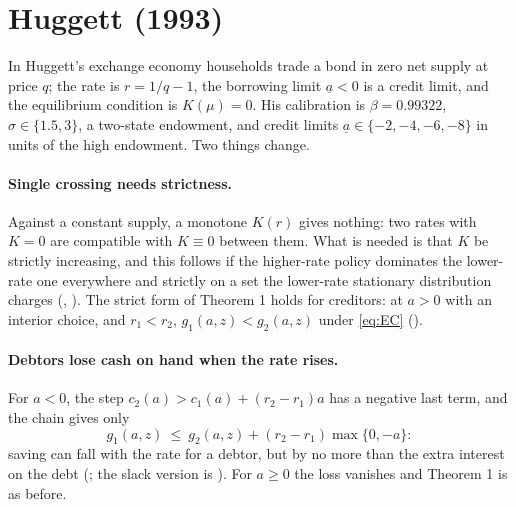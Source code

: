 \section{Huggett (1993)}\label{sec:huggett}

In Huggett's exchange economy households trade a bond in zero net supply at price $q$; the rate is
$r=1/q-1$, the borrowing limit $\underline a<0$ is a credit limit, and the equilibrium condition is
$K(\mu)=0$. His calibration is $\beta=0.99322$, $\sigma\in\{1.5,3\}$, a two-state endowment, and
credit limits $\underline a\in\{-2,-4,-6,-8\}$ in units of the high endowment. Two things change.

\paragraph{Single crossing needs strictness.}
Against a constant supply, a monotone $K(r)$ gives nothing: two rates with $K=0$ are compatible
with $K\equiv0$ between them. What is needed is that $K$ be strictly increasing, and this follows
if the higher-rate policy dominates the lower-rate one everywhere and strictly on a set the
lower-rate stationary distribution charges (,
). The strict form of Theorem 1 holds for creditors: at
$a>0$ with an interior choice, and $r_1<r_2$, $g_1(a,z)<g_2(a,z)$ under \eqref{eq:EC}
().

\paragraph{Debtors lose cash on hand when the rate rises.}
For $a<0$, the step $c_2(a)>c_1(a)+(r_2-r_1)a$ has a negative last term, and the chain gives only
\begin{equation}\label{eq:loss}
  g_1(a,z)\ \le\ g_2(a,z)+(r_2-r_1)\max\{0,-a\}:
\end{equation}
saving can fall with the rate for a debtor, but by no more than the extra interest on the debt
(; the slack version is
). For $a\ge0$ the loss vanishes and
Theorem 1 is as before.

